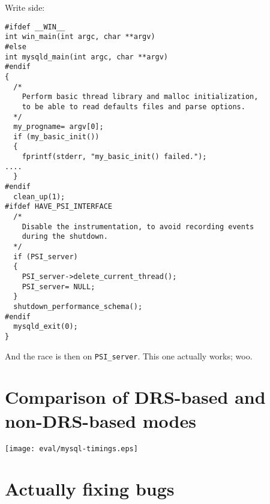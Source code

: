 Write side:

\begin{verbatim}
#ifdef __WIN__
int win_main(int argc, char **argv)
#else
int mysqld_main(int argc, char **argv)
#endif
{
  /*
    Perform basic thread library and malloc initialization,
    to be able to read defaults files and parse options.
  */
  my_progname= argv[0];
  if (my_basic_init())
  {
    fprintf(stderr, "my_basic_init() failed.");
....
  }
#endif
  clean_up(1);
#ifdef HAVE_PSI_INTERFACE
  /*
    Disable the instrumentation, to avoid recording events
    during the shutdown.
  */
  if (PSI_server)
  {
    PSI_server->delete_current_thread();
    PSI_server= NULL;
  }
  shutdown_performance_schema();
#endif
  mysqld_exit(0);
}
\end{verbatim}

And the race is then on \verb|PSI_server|.  This one actually works;
woo.

\section{Comparison of DRS-based and non-DRS-based modes}

\texttt{[image: eval/mysql-timings.eps]}

\section{Actually fixing bugs}
